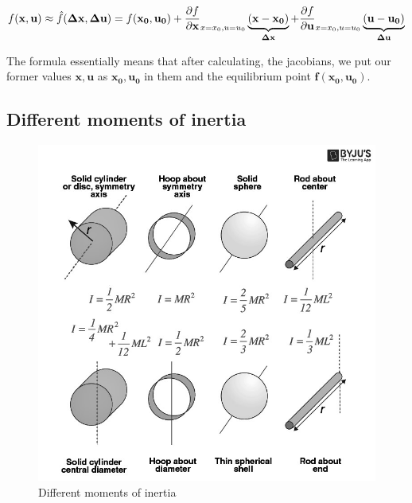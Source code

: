 \begin{equation}
    f(\mathbf{x,u}) \approx \Hat{f}(\mathbf{\Delta x,\Delta u}) = f(\mathbf{x_0,u_0}) + \frac{\partial f}{\partial \mathbf{x}}_{x=x_0, u=u_0} \underbrace{(\mathbf{x - x_0})}_\mathbf{\Delta x} + \frac{\partial f}{\partial \mathbf{u}}_{x=x_0, u=u_0} \underbrace{(\mathbf{u - u_0})}_\mathbf{\Delta u}
\end{equation}

The formula essentially means that after calculating,
the jacobians, we put our former values $\mathbf{x,u}$ as $\mathbf{x_0, u_0}$ in them and the equilibrium point $\mathbf{f(x_0,u_0)}$.


\subsection{Different moments of inertia}

\begin{figure}[H]
    \centering
\includegraphics[scale=0.4]{figures/moment of inertia.jpg}
    \caption{Different moments of inertia}
    \label{fig:moments of inertia}
\end{figure}
